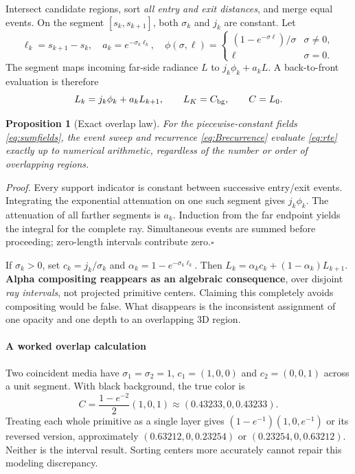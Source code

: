 \documentclass[11pt,letterpaper]{article}
\newcommand{\mini}[1]{\paragraph{#1}}
\newtheorem{prop}{Proposition}
\newcommand{\briefproof}[1]{\textit{Proof.} #1\hfill$\square$\par}
\begin{document}
Intersect candidate regions, sort \emph{all entry and exit distances}, and merge equal events. On the segment $[s_k,s_{k+1}]$, both $\sigma_k$ and $j_k$ are constant. Let
\begin{equation}
 \ell_k=s_{k+1}-s_k,\quad a_k=e^{-\sigma_k\ell_k},\quad
 \phi(\sigma,\ell)=\begin{cases}(1-e^{-\sigma\ell})/\sigma&\sigma\ne0,\\\ell&\sigma=0.\end{cases}
 \label{eq:phi}
\end{equation}
The segment maps incoming far-side radiance $L$ to $j_k\phi_k+a_kL$. A back-to-front evaluation is therefore
\begin{equation}
 L_k=j_k\phi_k+a_kL_{k+1},\qquad L_{K}=C_{\rm bg},\qquad C=L_0. \label{eq:Brecurrence}
\end{equation}
\begin{prop}[Exact overlap law]
For the piecewise-constant fields \eqref{eq:sumfields}, the event sweep and recurrence \eqref{eq:Brecurrence} evaluate \eqref{eq:rte} exactly up to numerical arithmetic, regardless of the number or order of overlapping regions.
\end{prop}
\briefproof{Every support indicator is constant between successive entry/exit events. Integrating the exponential attenuation on one such segment gives $j_k\phi_k$. The attenuation of all farther segments is $a_k$. Induction from the far endpoint yields the integral for the complete ray. Simultaneous events are summed before proceeding; zero-length intervals contribute zero.}

If $\sigma_k>0$, set $c_k=j_k/\sigma_k$ and $\alpha_k=1-e^{-\sigma_k\ell_k}$. Then $L_k=\alpha_kc_k+(1-\alpha_k)L_{k+1}$. \textbf{Alpha compositing reappears as an algebraic consequence}, over disjoint \emph{ray intervals}, not projected primitive centers. Claiming this completely avoids compositing would be false. What disappears is the inconsistent assignment of one opacity and one depth to an overlapping 3D region.

\mini{A worked overlap calculation}
Two coincident media have $\sigma_1=\sigma_2=1$, $c_1=(1,0,0)$ and $c_2=(0,0,1)$ across a unit segment. With black background, the true color is
\begin{equation}
 C=\frac{1-e^{-2}}2(1,0,1)\approx(0.43233,0,0.43233).
\end{equation}
Treating each whole primitive as a single layer gives $(1-e^{-1})(1,0,e^{-1})$ or its reversed version, approximately $(0.63212,0,0.23254)$ or $(0.23254,0,0.63212)$. Neither is the interval result. Sorting centers more accurately cannot repair this modeling discrepancy.
\end{document}
